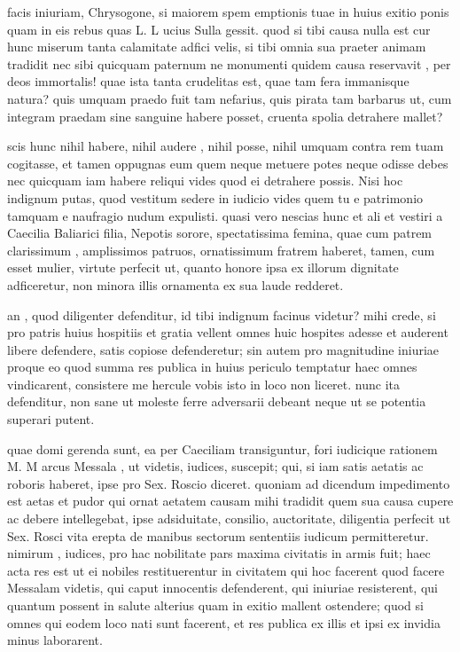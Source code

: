  facis iniuriam, Chrysogone, si maiorem spem emptionis tuae in huius exitio ponis quam in eis rebus quas L. L ucius Sulla gessit. quod si tibi causa nulla est cur hunc miserum tanta calamitate adfici velis, si tibi omnia sua praeter animam tradidit nec sibi quicquam paternum ne monumenti quidem causa reservavit , per deos immortalis! quae ista tanta crudelitas est, quae tam fera immanisque natura? quis umquam praedo fuit tam nefarius, quis pirata tam barbarus ut, cum integram praedam sine sanguine habere posset, cruenta spolia detrahere mallet?

 scis hunc nihil habere, nihil audere , nihil posse, nihil umquam contra rem tuam cogitasse, et tamen oppugnas eum quem neque metuere potes neque odisse debes nec quicquam iam habere reliqui vides quod ei detrahere possis. Nisi hoc indignum putas, quod vestitum sedere in iudicio vides quem tu e patrimonio tamquam e naufragio nudum expulisti. quasi vero nescias hunc et ali et vestiri a Caecilia Baliarici filia, Nepotis sorore, spectatissima femina, quae cum patrem clarissimum , amplissimos patruos, ornatissimum fratrem haberet, tamen, cum esset mulier, virtute perfecit ut, quanto honore ipsa ex illorum dignitate adficeretur, non minora illis ornamenta ex sua laude redderet.

 an , quod diligenter defenditur, id tibi indignum facinus videtur? mihi crede, si pro patris huius hospitiis et gratia vellent omnes huic hospites adesse et auderent libere defendere, satis copiose defenderetur; sin autem pro magnitudine iniuriae proque eo quod summa res publica in huius periculo temptatur haec omnes vindicarent, consistere me hercule vobis isto in loco non liceret. nunc ita defenditur, non sane ut moleste ferre adversarii debeant neque ut se potentia superari putent.

 quae domi gerenda sunt, ea per Caeciliam transiguntur, fori iudicique rationem M. M arcus Messala , ut videtis, iudices, suscepit; qui, si iam satis aetatis ac roboris haberet, ipse pro Sex. Roscio diceret. quoniam ad dicendum impedimento est aetas et pudor qui ornat aetatem causam mihi tradidit quem sua causa cupere ac debere intellegebat, ipse adsiduitate, consilio, auctoritate, diligentia perfecit ut Sex. Rosci vita erepta de manibus sectorum sententiis iudicum permitteretur. nimirum , iudices, pro hac nobilitate pars maxima civitatis in armis fuit; haec acta res est ut ei nobiles restituerentur in civitatem qui hoc facerent quod facere Messalam videtis, qui caput innocentis defenderent, qui iniuriae resisterent, qui quantum possent in salute alterius quam in exitio mallent ostendere; quod si omnes qui eodem loco nati sunt facerent, et res publica ex illis et ipsi ex invidia minus laborarent.

